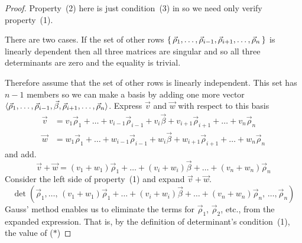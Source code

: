 \begin{proof}
Property~(2) here is just condition~(3) in 
so we need only verify property~(1).

There are two cases.
If the set of other rows
\(
  \mbox{$\{\,\vec{\rho}_1,\dots,\vec{\rho}_{i-1},\vec{\rho}_{i+1},
       \dots,\vec{\rho}_n\,\}$} 
\)
is linearly dependent then all three matrices are singular and so all
three determinants are zero and the equality is trivial.

Therefore assume that the set of other rows is linearly independent.
This set has $n-1$ members so we can make a basis by 
adding one more vector
$\langle\vec{\rho}_1,\dots,\vec{\rho}_{i-1},\vec{\beta},
               \vec{\rho}_{i+1},\dots,\vec{\rho}_n\rangle$.
Express $\vec{v}$ and $\vec{w}$ with respect to this basis
\begin{align*}
  \vec{v} &=v_1\vec{\rho}_1+\dots+v_{i-1}\vec{\rho}_{i-1}+v_i\vec{\beta}
            +v_{i+1}\vec{\rho}_{i+1}+\dots+v_n\vec{\rho}_n                \\
  \vec{w} &= w_1\vec{\rho}_1+\dots+w_{i-1}\vec{\rho}_{i-1}+w_i\vec{\beta}
            +w_{i+1}\vec{\rho}_{i+1}+\dots+w_n\vec{\rho}_n
\end{align*}
and add.
\begin{equation*}
  \vec{v}+\vec{w}
  =
  (v_1+w_1)\vec{\rho}_1+\dots+(v_i+w_i)\vec{\beta}
            +\dots+(v_n+w_n)\vec{\rho}_n 
\end{equation*}
Consider the left side of property~(1) and expand $\vec{v}+\vec{w}$.
\begin{equation*}
    \det (\vec{\rho}_1,\dots,\,(v_1+w_1)\vec{\rho}_1+\dots+(v_i+w_i)\vec{\beta}
            +\dots+(v_n+w_n)\vec{\rho}_n,\,\dots,\vec{\rho}_n) 
   \tag{*}
\end{equation*}
Gauss' method enables us to eliminate the terms for $\vec{\rho}_1$,
$\vec{\rho}_2$, etc., from the expanded expression.
That is, by the definition of determinant's condition~(1), the value of 
($*$) %

\end{proof}
